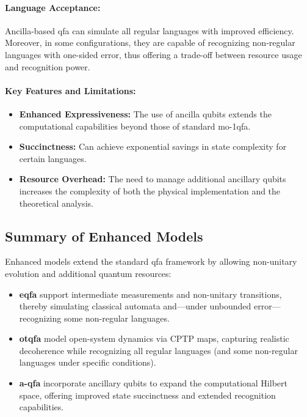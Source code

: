 \paragraph{Language Acceptance:}  
Ancilla-based qfa can simulate all regular languages with improved efficiency. Moreover, in some configurations, they are capable of recognizing non-regular languages with one-sided error, thus offering a trade-off between resource usage and recognition power.

\paragraph{Key Features and Limitations:}
\begin{itemize}
    \item \textbf{Enhanced Expressiveness:} The use of ancilla qubits extends the computational capabilities beyond those of standard mo-1qfa.
    \item \textbf{Succinctness:} Can achieve exponential savings in state complexity for certain languages.
    \item \textbf{Resource Overhead:} The need to manage additional ancillary qubits increases the complexity of both the physical implementation and the theoretical analysis.
\end{itemize}

\subsection*{Summary of Enhanced Models}
Enhanced models extend the standard qfa framework by allowing non-unitary evolution and additional quantum resources:
\begin{itemize}
    \item \textbf{\gls{eqfa}} support intermediate measurements and non-unitary transitions, thereby simulating classical automata and—under unbounded error—recognizing some non-regular languages.
    \item \textbf{\gls{otqfa}} model open-system dynamics via CPTP maps, capturing realistic decoherence while recognizing all regular languages (and some non-regular languages under specific conditions).
    \item \textbf{\gls{a-qfa}} incorporate ancillary qubits to expand the computational Hilbert space, offering improved state succinctness and extended recognition capabilities.
\end{itemize}

